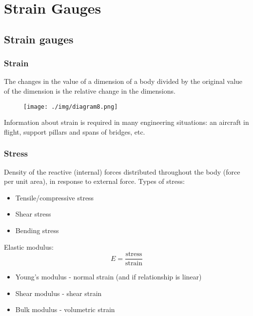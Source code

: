 \chapter{Strain Gauges}
\section{Strain gauges}
\subsection{Strain}
The changes in the value of a dimension of a body divided by the original value of the dimension is the relative change in the dimensions.
\begin{figure}[H]
  \centering
  \texttt{[image: ./img/diagram8.png]}
\end{figure}
Information about strain is required in many engineering situations: an aircraft in flight, support pillars and spans of bridges, etc.
\subsection{Stress}
Density of the reactive (internal) forces distributed throughout the body (force per unit area), in response to external force. Types of stress:
\begin{itemize}
  \item Tensile/compressive stress
  \item Shear stress
  \item Bending stress
\end{itemize}
Elastic modulus:
\begin{equation}
  E = \frac{\textrm{stress}}{\textrm{strain}}
\end{equation}
\begin{itemize}
  \item Young's modulus - normal strain (and if relationship is linear)
  \item Shear modulus - shear strain
  \item Bulk modulus - volumetric strain
\end{itemize}
